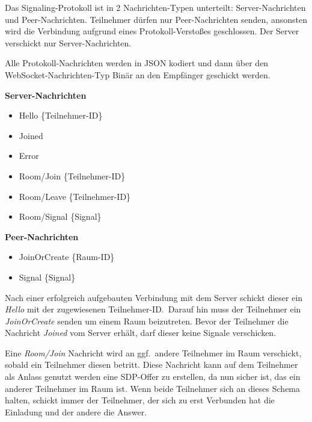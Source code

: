 \documentclass{article}
\begin{document}
\begin{onecolumn}
Das Signaling-Protokoll ist in 2 Nachrichten-Typen unterteilt:
Server-Nachrichten und Peer-Nachrichten. Teilnehmer dürfen nur Peer-Nachrichten
senden, ansonsten wird die Verbindung aufgrund eines Protokoll-Verstoßes
geschlossen. Der Server verschickt nur Server-Nachrichten.

Alle Protokoll-Nachrichten werden in JSON kodiert und dann über den
WebSocket-Nachrichten-Typ Binär an den Empfänger geschickt werden.

\vspace{0.5em}

\textbf{Server-Nachrichten}

\begin{itemize}
	\item Hello \{Teilnehmer-ID\}
	\item Joined
	\item Error
	\item Room/Join \{Teilnehmer-ID\}
	\item Room/Leave \{Teilnehmer-ID\}
	\item Room/Signal \{Signal\}
\end{itemize}

\vspace{0.5em}

\textbf{Peer-Nachrichten}

\begin{itemize}
	\item JoinOrCreate \{Raum-ID\}
	\item Signal \{Signal\}
\end{itemize}

\vspace{0.5em}

Nach einer erfolgreich aufgebauten Verbindung mit dem Server schickt dieser ein
\textit{Hello} mit der zugewiesenen Teilnehmer-ID.\ Darauf hin muss der
Teilnehmer ein \textit{JoinOrCreate} senden um einem Raum beizutreten. Bevor
der Teilnehmer die Nachricht \textit{Joined} vom Server erhält, darf dieser keine
Signale verschicken.

Eine \textit{Room/Join} Nachricht wird an ggf.\ andere Teilnehmer im Raum
verschickt, sobald ein Teilnehmer diesen betritt. Diese Nachricht kann auf dem
Teilnehmer als Anlass genutzt werden eine SDP-Offer zu erstellen, da nun sicher
ist, das ein anderer Teilnehmer im Raum ist. Wenn beide Teilnehmer sich an dieses
Schema halten, schickt immer der Teilnehmer, der sich zu erst Verbunden hat die
Einladung und der andere die Answer.


\end{onecolumn}
\end{document}
